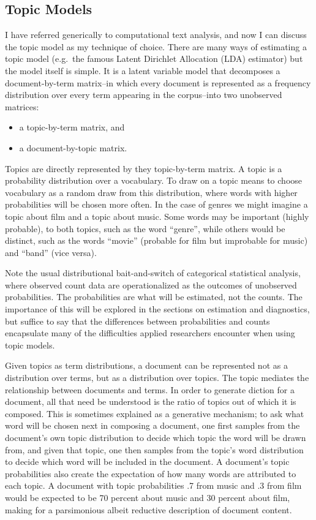 \documentclass[]{book}
\providecommand{\tightlist}{%
  \setlength{\itemsep}{0pt}\setlength{\parskip}{0pt}}
\theoremstyle{definition}
\theoremstyle{definition}
\theoremstyle{definition}
\theoremstyle{remark}
\begin{document}
\hypertarget{topic-models}{%
\subsection{Topic Models}\label{topic-models}}

I have referred generically to computational text analysis, and now I
can discuss the topic model as my technique of choice. There are many
ways of estimating a topic model (e.g.~the famous Latent Dirichlet
Allocation (LDA) estimator) but the model itself is simple. It is a
latent variable model that decomposes a document-by-term matrix--in
which every document is represented as a frequency distribution over
every term appearing in the corpus--into two unobserved matrices:

\begin{itemize}
\tightlist
\item
  a topic-by-term matrix, and
\item
  a document-by-topic matrix.
\end{itemize}

Topics are directly represented by they topic-by-term matrix. A topic is
a probability distribution over a vocabulary. To draw on a topic means
to choose vocabulary as a random draw from this distribution, where
words with higher probabilities will be chosen more often. In the case
of genres we might imagine a topic about film and a topic about music.
Some words may be important (highly probable), to both topics, such as
the word ``genre'', while others would be distinct, such as the words
``movie'' (probable for film but improbable for music) and ``band''
(vice versa).

Note the usual distributional bait-and-switch of categorical statistical
analysis, where observed count data are operationalized as the outcomes
of unobserved probabilities. The probabilities are what will be
estimated, not the counts. The importance of this will be explored in
the sections on estimation and diagnostics, but suffice to say that the
differences between probabilities and counts encapsulate many of the
difficulties applied researchers encounter when using topic models.

Given topics as term distributions, a document can be represented not as
a distribution over terms, but as a distribution over topics. The topic
mediates the relationship between documents and terms. In order to
generate diction for a document, all that need be understood is the
ratio of topics out of which it is composed. This is sometimes explained
as a generative mechanism; to ask what word will be chosen next in
composing a document, one first samples from the document's own topic
distribution to decide which topic the word will be drawn from, and
given that topic, one then samples from the topic's word distribution to
decide which word will be included in the document. A document's topic
probabilities also create the expectation of how many words are
attributed to each topic. A document with topic probabilities .7 from
music and .3 from film would be expected to be 70 percent about music
and 30 percent about film, making for a parsimonious albeit reductive
description of document content.
\end{document}
